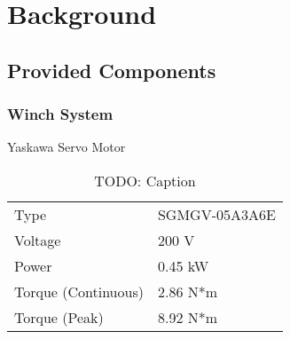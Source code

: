 \chapter{Background}
\label{background}


\section{Provided Components}
\subsection{Winch System}

Yaskawa Servo Motor
\begin{table}[h!]
	\centering
	\caption{TODO: Caption}
	\begin{tabular}{|l|l|}
	\hline
	\rowcolor{lightgray}
	\multicolumn{2}{|c|}{Yaskawa AC Servo Motor}        \\ \hline
	Type                & SGMGV-05A3A6E                 \\ \hline
	Voltage             & 200 V                         \\ \hline
	Power               & 0.45 kW                       \\ \hline
	Torque (Continuous) & 2.86 N*m                      \\ \hline
	Torque (Peak)       & 8.92 N*m                      \\ \hline
	\end{tabular}
\end{table}